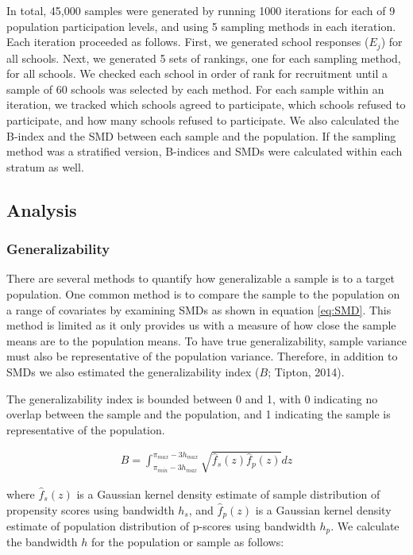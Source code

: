 \documentclass[
  english,
  man,floatsintext]{apa6}
\begin{document}
In total, 45,000 samples were generated by running 1000 iterations for each of 9 population participation levels, and using 5 sampling methods in each iteration. Each iteration proceeded as follows. First, we generated school responses (\(E_j\)) for all schools. Next, we generated 5 sets of rankings, one for each sampling method, for all schools. We checked each school in order of rank for recruitment until a sample of 60 schools was selected by each method. For each sample within an iteration, we tracked which schools agreed to participate, which schools refused to participate, and how many schools refused to participate. We also calculated the B-index and the SMD between each sample and the population. If the sampling method was a stratified version, B-indices and SMDs were calculated within each stratum as well.

\hypertarget{analysis}{%
\subsection{Analysis}\label{analysis}}

\hypertarget{generalizability}{%
\subsubsection{Generalizability}\label{generalizability}}

There are several methods to quantify how generalizable a sample is to a target population. One common method is to compare the sample to the population on a range of covariates by examining SMDs as shown in equation \eqref{eq:SMD}. This method is limited as it only provides us with a measure of how close the sample means are to the population means. To have true generalizability, sample variance must also be representative of the population variance. Therefore, in addition to SMDs we also estimated the generalizability index (\(B\); Tipton, 2014).

The generalizability index is bounded between 0 and 1, with 0 indicating no overlap between the sample and the population, and 1 indicating the sample is representative of the population.

\begin{align}
B = \int_{\pi_{min}-3h_{max}}^{\pi_{max}-3h_{max}}\sqrt{\hat{f}_s(z)\hat{f}_p(z)}dz
\end{align}

where \(\hat{f}_s(z)\) is a Gaussian kernel density estimate of sample distribution of propensity scores using bandwidth \(h_s\), and \(\hat{f}_p(z)\) is a Gaussian kernel density estimate of population distribution of p-scores using bandwidth \(h_p\). We calculate the bandwidth \(h\) for the population or sample as follows:
\end{document}
